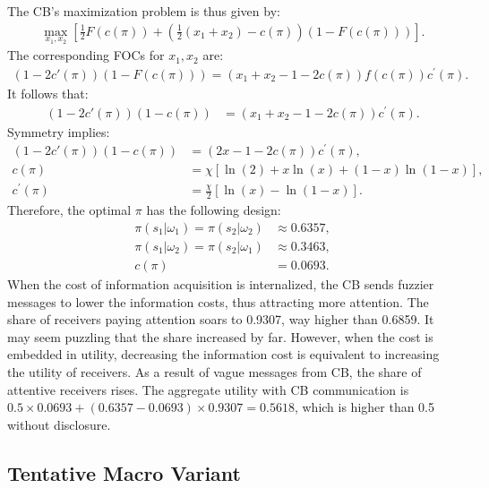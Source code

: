 \documentclass[12pt,a4paper]{article}
\begin{document}
The CB's maximization problem is thus given by:
\begin{align}
    \max_{x_1,x_2} \left[\frac{1}{2}F(c(\pi)) + \left(\frac{1}{2}(x_1+x_2)-c(\pi)\right)(1-F(c(\pi)))\right].
\end{align}
The corresponding FOCs for $x_1,x_2$ are:
\begin{align}
    (1-2c'(\pi))(1-F(c(\pi)))=(x_1+x_2-1-2c(\pi))f(c(\pi))c^\prime(\pi).
\end{align}
It follows that:
\begin{align}
    (1-2c'(\pi))(1-c(\pi)) & = (x_1+x_2-1-2c(\pi))c^\prime(\pi).
\end{align}
Symmetry implies:
\begin{align}
    (1-2c'(\pi))(1-c(\pi)) & = (2x-1-2c(\pi))c^\prime(\pi), \\
    c(\pi) & = \chi[\ln(2)+x\ln(x)+(1-x)\ln(1-x)], \\
    c^\prime(\pi) & = \frac{\chi}{2}[\ln(x)-\ln(1-x)].
\end{align}
Therefore, the optimal $\pi$ has the following design:
\begin{align}
    \pi(s_1|\omega_1) = \pi(s_2|\omega_2) & \approx 0.6357, \\
    \pi(s_1|\omega_2) = \pi(s_2|\omega_1) & \approx 0.3463, \\
    c(\pi) & = 0.0693.
\end{align}
When the cost of information acquisition is internalized, the CB sends fuzzier messages to lower the information costs, thus attracting more attention. The share of receivers paying attention soars to 0.9307, way higher than 0.6859. It may seem puzzling that the share increased by far. However, when the cost is embedded in utility, decreasing the information cost is equivalent to increasing the utility of receivers. As a result of vague messages from CB, the share of attentive receivers rises. The aggregate utility with CB communication is $0.5 \times 0.0693 + (0.6357-0.0693) \times  0.9307 = 0.5618$, which is higher than 0.5 without disclosure. 

\subsection{Tentative Macro Variant}
\end{document}

